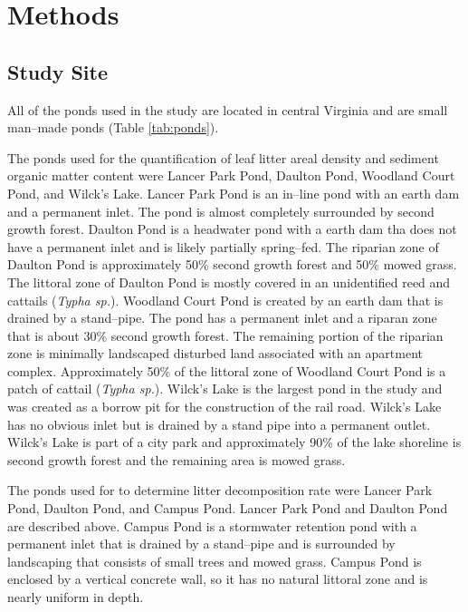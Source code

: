 \documentclass[12pt,letter]{article}
\begin{document}
\section{Methods}
\subsection{Study Site}
All of the ponds used in the study are located in central Virginia and are small man--made ponds (Table \ref{tab:ponds}).

The ponds used for the quantification of leaf litter areal density and sediment organic matter content were Lancer Park Pond, Daulton Pond, Woodland Court Pond, and Wilck's Lake. Lancer Park Pond is an in--line pond with an earth dam and a permanent inlet. The pond is almost completely surrounded by second growth forest. Daulton Pond is a headwater pond with a earth dam tha does not have a permanent inlet and is likely partially spring--fed. The riparian zone of Daulton Pond is approximately 50\% second growth forest and 50\% mowed grass. The littoral zone of Daulton Pond is mostly covered in an unidentified reed and cattails (\emph{Typha sp.}). Woodland Court Pond is created by an earth dam that is drained by a stand--pipe. The pond has a permanent inlet and a riparan zone that is about 30\% second growth forest. The remaining portion of the riparian zone is minimally landscaped disturbed land associated with an apartment complex. Approximately 50\% of the littoral zone of Woodland Court Pond is a patch of cattail (\emph{Typha sp.}).  Wilck's Lake is the largest pond in the study and was created as a borrow pit for the construction of the rail road. Wilck's Lake has no obvious inlet but is drained by a stand pipe into a permanent outlet. Wilck's Lake is part of a city park and approximately 90\% of the lake shoreline is second growth forest and the remaining area is mowed grass.
 

The ponds used for to determine litter decomposition rate were Lancer Park Pond, Daulton Pond, and Campus Pond. Lancer Park Pond and Daulton Pond are described above. Campus Pond is a stormwater retention pond with a permanent inlet that is drained by a stand--pipe and is surrounded by landscaping that consists of small trees and mowed grass. Campus Pond is enclosed by a vertical concrete wall, so it has no natural littoral zone and is nearly uniform in depth.    
\end{document}
